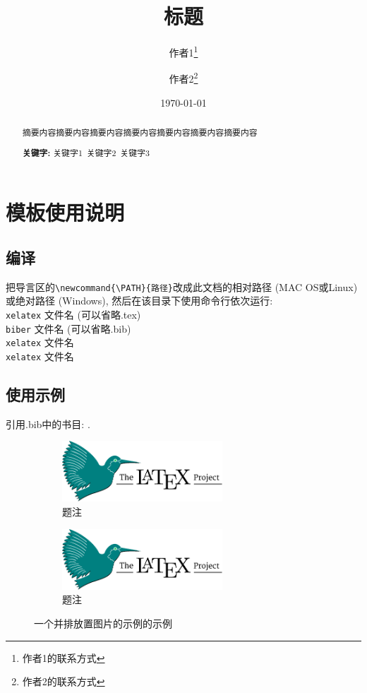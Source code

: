 \documentclass{ctexart}
\title{标题}
\author{ 作者1\thanks{作者1的联系方式}
	\and
		作者2\thanks{作者2的联系方式}}
\date{\today} %
\begin{document}
\maketitle %

\begin{abstract}
	摘要内容摘要内容摘要内容摘要内容摘要内容摘要内容摘要内容

	\centering %
	\textbf{关键字:}
		关键字1\ 
		关键字2\  
		关键字3
\end{abstract}

\tableofcontents
\newpage

\section{模板使用说明}
\subsection{编译}
把导言区的\verb|\newcommand{\PATH}{路径}|改成此文档的相对路径 (MAC OS或Linux) 或绝对路径 (Windows), 然后在该目录下使用命令行依次运行:\\[1pt]
\texttt{xelatex} 文件名 (可以省略.tex)\\
\texttt{biber} 文件名 (可以省略.bib)\\
\texttt{xelatex} 文件名\\
\texttt{xelatex} 文件名\\

\subsection{使用示例}

引用.bib中的书目: \cite{Knuth}.

\begin{figure}[h] %
\centering
\begin{subfigure}{.5\textwidth}
	\centering
	\includegraphics[width=6cm]{latex-project-logo.pdf}
	\caption{题注}
	\label{子图1}
\end{subfigure}%
\begin{subfigure}{.5\textwidth}
	\centering
	\includegraphics[width=6cm]{latex-project-logo.pdf}
	\caption{题注}
	\label{子图2}
\end{subfigure}
\caption{一个并排放置图片的示例的示例}
\end{figure}
\end{document}
